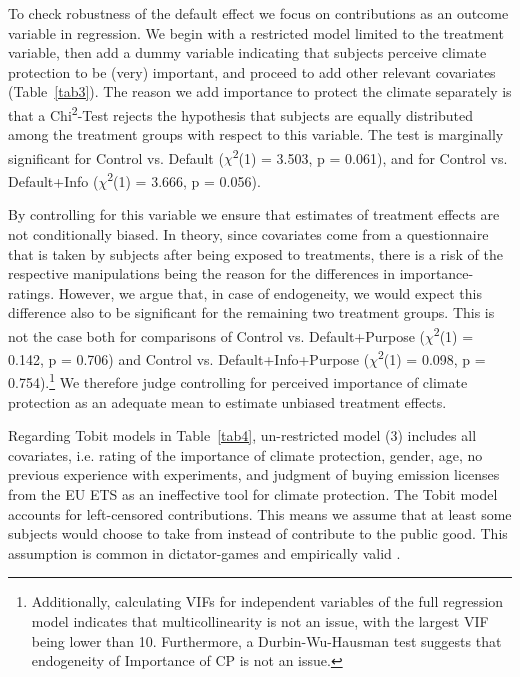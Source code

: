 \documentclass[review, authoryear,12pt]{elsarticle}
\begin{document}
To check robustness of the default effect we focus on contributions as an outcome variable in regression. We begin with a restricted model limited to the treatment variable, then add a dummy variable indicating that subjects perceive climate protection to be (very) important, and proceed to add other relevant covariates (Table~\ref{tab3}). The reason we add importance to protect the climate separately is that a Chi\textsuperscript{2}-Test rejects the hypothesis that subjects are equally distributed among the treatment groups with respect to this variable. The test is marginally significant for Control vs. Default ($\chi$\textsuperscript{2}(1) = 3.503, p = 0.061), and for Control vs. Default+Info ($\chi$\textsuperscript{2}(1) = 3.666, p = 0.056).

By controlling for this variable we ensure that estimates of treatment effects are not conditionally biased. In theory, since covariates come from a questionnaire that is taken by subjects after being exposed to treatments, there is a risk of the respective manipulations being the reason for the differences in importance-ratings. However, we argue that, in case of endogeneity, we would expect this difference also to be significant for the remaining two treatment groups. This is not the case both for comparisons of Control vs. Default+Purpose ($\chi$\textsuperscript{2}(1) = 0.142, p = 0.706) and Control vs. Default+Info+Purpose ($\chi$\textsuperscript{2}(1) = 0.098, p = 0.754).\footnote{Additionally, calculating VIFs for independent variables of the full regression model indicates that multicollinearity is not an issue, with the largest VIF being lower than 10. Furthermore, a Durbin-Wu-Hausman test suggests that endogeneity of Importance of CP is not an issue.} We therefore judge controlling for perceived importance of climate protection as an adequate mean to estimate unbiased treatment effects.

Regarding Tobit models in Table~\ref{tab4}, un-restricted model (3) includes all covariates, i.e. rating of the importance of climate protection, gender, age, no previous experience with experiments, and judgment of buying emission licenses from the EU ETS as an ineffective tool for climate protection. The Tobit model accounts for left-censored contributions. This means we assume that at least some subjects would choose to take from instead of contribute to the public good. This assumption is common in dictator-games and empirically valid \citep{Engel.2011}.
\end{document}
